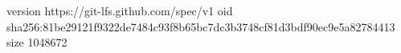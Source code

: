 version https://git-lfs.github.com/spec/v1
oid sha256:81be29121f9322de7484c93f8b65bc7dc3b3748cf81d3bdf90ec9e5a82784413
size 1048672
